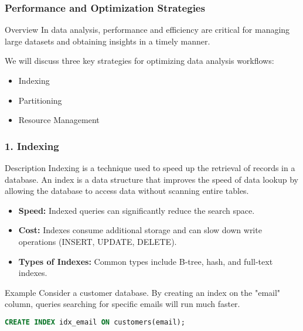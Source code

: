\documentclass{beamer}
\begin{document}
\begin{frame}[fragile]
    \frametitle{Performance and Optimization Strategies}
    \begin{block}{Overview}
        In data analysis, performance and efficiency are critical for managing large datasets and obtaining insights in a timely manner. 
    \end{block}
    We will discuss three key strategies for optimizing data analysis workflows:
    \begin{itemize}
        \item Indexing
        \item Partitioning
        \item Resource Management
    \end{itemize}
\end{frame}

\begin{frame}[fragile]
    \frametitle{1. Indexing}
    \begin{block}{Description}
        Indexing is a technique used to speed up the retrieval of records in a database. An index is a data structure that improves the speed of data lookup by allowing the database to access data without scanning entire tables.
    \end{block}
    
    \begin{itemize}
        \item \textbf{Speed:} Indexed queries can significantly reduce the search space.
        \item \textbf{Cost:} Indexes consume additional storage and can slow down write operations (INSERT, UPDATE, DELETE).
        \item \textbf{Types of Indexes:} Common types include B-tree, hash, and full-text indexes.
    \end{itemize}
    
    \begin{block}{Example}
        Consider a customer database. By creating an index on the "email" column, queries searching for specific emails will run much faster.
    \end{block}

    \begin{lstlisting}[language=SQL]
CREATE INDEX idx_email ON customers(email);
    \end{lstlisting}
\end{frame}
\end{document}
